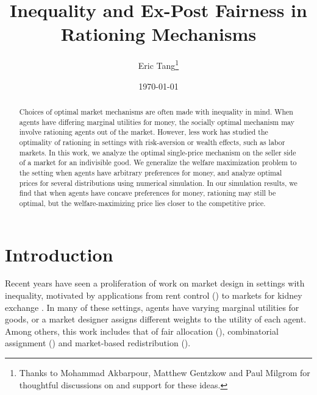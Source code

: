 \documentclass[AER]{AEA}
\begin{document}
\title{Inequality and Ex-Post Fairness in Rationing Mechanisms}
\author{Eric Tang\thanks{%
Thanks to Mohammad Akbarpour, Matthew Gentzkow and Paul Milgrom for thoughtful discussions on and support for these ideas.}}
\date{\today}
\JEL{}
\Keywords{}

\begin{abstract}
    Choices of optimal market mechanisms are often made with inequality in mind. When agents have differing marginal utilities for money, the socially optimal mechanism may involve rationing agents out of the market. However, less work has studied the optimality of rationing in settings with risk-aversion or wealth effects, such as labor markets. In this work, we analyze the optimal single-price mechanism on the seller side of a market for an indivisible good. We generalize the welfare maximization problem to the setting when agents have arbitrary preferences for money, and analyze optimal prices for several distributions using numerical simulation. In our simulation results, we find that when agents have concave preferences for money, rationing may still be optimal, but the welfare-maximizing price lies closer to the competitive price.
\end{abstract}

\maketitle

\section{Introduction}


Recent years have seen a proliferation of work on market design in settings with inequality, motivated by applications from rent control (\cite{diamond-2019}) to markets for kidney exchange \cite{dworczak-2020}. In many of these settings, agents have varying marginal utilities for goods, or a market designer assigns different weights to the utility of each agent. Among others, this work includes that of fair allocation (\cite{babaioff-2019}), combinatorial assignment (\cite{budish-2011}) and market-based redistribution (\cite{akbarpour-2020}).
\end{document}
